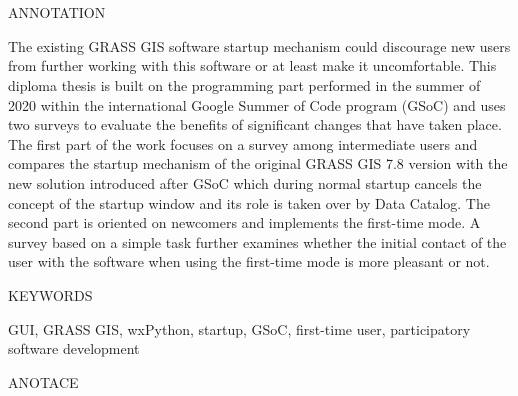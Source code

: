 \documentclass[a4paper,10pt,twoside]{article}
\begin{document}

\newpage ~ \newpage
\thispagestyle{empty}

\begin{figure}
 \centering 
 
\end{figure}


\newpage ~ \newpage
\newpage ~ \newpage
\thispagestyle{empty}


\renewcommand{\baselinestretch}{1.25} %


\begin{Large}
\noindent ANNOTATION
\end{Large}

\large
\noindent
The existing GRASS GIS software startup mechanism could discourage new users from further working with this software or at least make it uncomfortable. This diploma thesis is built on the programming part performed in the summer of 2020 within the international Google Summer of Code program (GSoC) and uses two surveys to evaluate the benefits of significant changes that have taken place. The first part of the work focuses on a survey among intermediate users and compares the startup mechanism of the original GRASS GIS 7.8 version with the new solution introduced after GSoC which during normal startup cancels the concept of the startup window and its role is taken over by Data Catalog. The second part is oriented on newcomers and implements the first-time mode. A survey based on a simple task further examines whether the initial contact of the user with the software when using the first-time mode is more pleasant or not.

\vspace{2ex}
\begin{Large}
\noindent KEYWORDS
\end{Large}

\large
\noindent
\textrm{GUI, GRASS GIS, wxPython, startup, GSoC, first-time user, participatory software development}

\mbox{}
\vfill

\begin{Large}
\noindent ANOTACE
\end{Large} 
\end{document}
